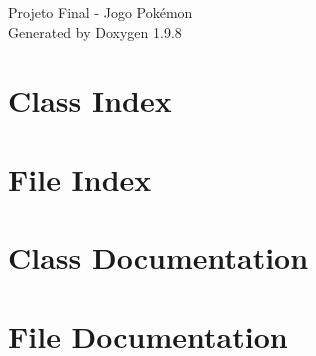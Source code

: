 \documentclass[twoside]{book}
\newcommand{\+}{\discretionary{\mbox{\scriptsize$\hookleftarrow$}}{}{}}
\newcommand{\clearemptydoublepage}{%
    \newpage{\pagestyle{empty}\cleardoublepage}%
  }
\begin{document}
  \raggedbottom
    \hypersetup{pageanchor=false,
                bookmarksnumbered=true,
                pdfencoding=unicode
               }
  \begin{titlepage}
  \vspace*{7cm}
  \begin{center}%
  {\Large Projeto Final -\/ Jogo Pokémon}\\
  \vspace*{1cm}
  {\large Generated by Doxygen 1.9.8}\\
  \end{center}
  \end{titlepage}
  \clearemptydoublepage
  \tableofcontents
  \clearemptydoublepage
  \hypersetup{pageanchor=true}

\chapter{Class Index}

\chapter{File Index}

\chapter{Class Documentation}










\chapter{File Documentation}






























  \backmatter
  \newpage
  \clearemptydoublepage
  \printindex
\end{document}
